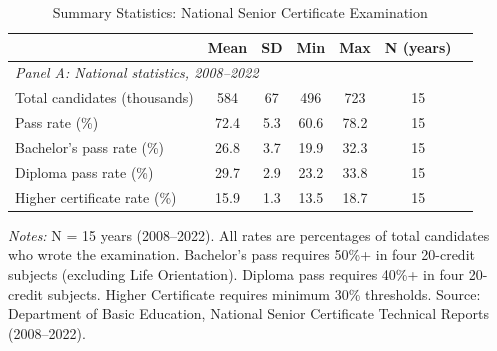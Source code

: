 \begin{table}[H]
\centering
\caption{Summary Statistics: National Senior Certificate Examination}
\label{tab:summary_nsc}
\begin{threeparttable}
\begin{tabular}{lcccccc}
\toprule
 & Mean & SD & Min & Max & N (years) \\
\midrule
\multicolumn{6}{l}{\textit{Panel A: National statistics, 2008--2022}} \\
Total candidates (thousands) & 584 & 67 & 496 & 723 & 15 \\
Pass rate (\%) & 72.4 & 5.3 & 60.6 & 78.2 & 15 \\
Bachelor's pass rate (\%) & 26.8 & 3.7 & 19.9 & 32.3 & 15 \\
Diploma pass rate (\%) & 29.7 & 2.9 & 23.2 & 33.8 & 15 \\
Higher certificate rate (\%) & 15.9 & 1.3 & 13.5 & 18.7 & 15 \\
\bottomrule
\end{tabular}
\begin{tablenotes}[flushleft]
\small
\item \textit{Notes:} N = 15 years (2008--2022). All rates are percentages of total candidates who wrote the examination. Bachelor's pass requires 50\%+ in four 20-credit subjects (excluding Life Orientation). Diploma pass requires 40\%+ in four 20-credit subjects. Higher Certificate requires minimum 30\% thresholds. Source: Department of Basic Education, National Senior Certificate Technical Reports (2008--2022).
\end{tablenotes}
\end{threeparttable}
\end{table}
